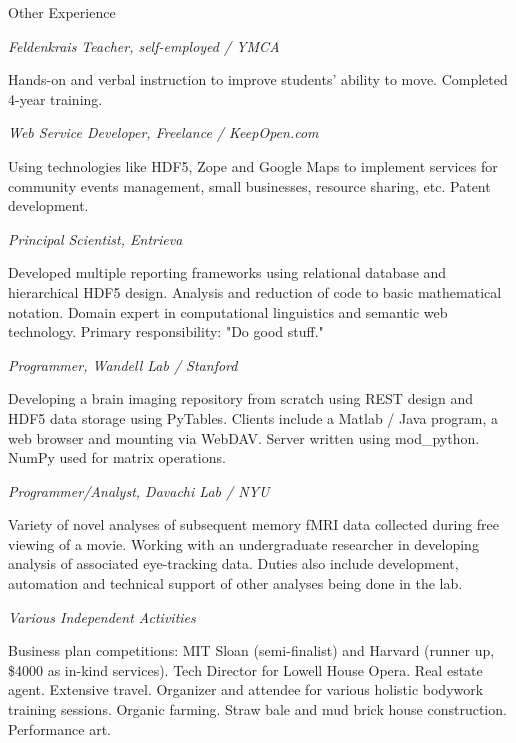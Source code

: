 \begin{rubric}{Other Experience}

\entry*[2007--present] \emph{Feldenkrais Teacher, self-employed / YMCA}
    \par Hands-on and verbal instruction to improve students' ability to move.
    Completed 4-year training.


\entry*[2004--present] \emph{Web Service Developer, Freelance / KeepOpen.com}
    \par Using technologies like HDF5, Zope and Google Maps to implement services
    for community events management, small businesses, resource sharing, etc.
    Patent development.

\entry*[2006--2007] \emph{Principal Scientist, Entrieva}
    \par Developed multiple reporting frameworks using relational database and
    hierarchical HDF5 design.  Analysis and reduction of code to basic
    mathematical notation.  Domain expert in computational linguistics and
    semantic web technology.  Primary responsibility: "Do good stuff."

\entry*[2006] \emph{Programmer, Wandell Lab / Stanford}
    \par Developing a brain imaging repository from scratch using REST design
    and HDF5 data storage using PyTables.  Clients include a Matlab /
    Java program, a web browser and mounting via WebDAV.  Server
    written using mod_python.  NumPy used for matrix operations.

\entry*[2005--2006] \emph{Programmer/Analyst, Davachi Lab / NYU}
    \par Variety of novel analyses of subsequent memory fMRI data collected
    during free viewing of a movie.  Working with an undergraduate researcher in
    developing analysis of associated eye-tracking data.  Duties also include
    development, automation and technical support of other analyses being done
    in the lab.

\entry*[2003--2004] \emph{Various Independent Activities}
\par Business plan competitions:  MIT Sloan (semi-finalist) and Harvard (runner up,
\$4000 as in-kind services). Tech Director for Lowell House Opera.  Real estate
agent.  Extensive travel.  Organizer and attendee for various holistic bodywork
training sessions.  Organic farming.  Straw bale and mud brick house
construction.  Performance art.


\end{rubric}

